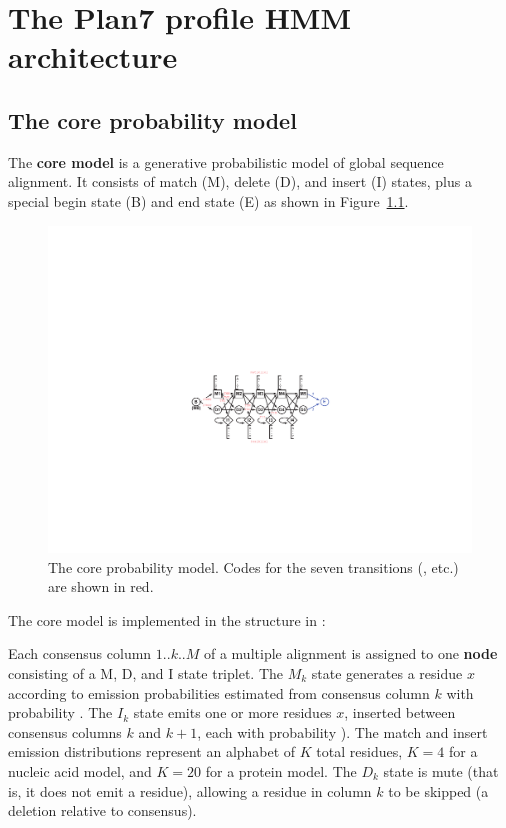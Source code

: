 
\chapter{The Plan7 profile HMM architecture}

%
\section{The core probability model}
%

The \textbf{core model} is a generative probabilistic model of global
sequence alignment. It consists of match (M), delete (D), and insert
(I) states, plus a special begin state (B) and end state (E) as shown
in Figure~\ref{fig:plan7-core}.

\begin{figure}
\begin{center}
\includegraphics{figures/plan7-core}
\end{center}
\caption{The core probability model. Codes for the seven
transitions (, etc.) are shown in red.} 
\label{fig:plan7-core}
\end{figure}

The core model is implemented in the  structure in
:



Each consensus column $1..k..M$ of a multiple alignment is assigned to
one \textbf{node} consisting of a M, D, and I state triplet. The $M_k$
state generates a residue $x$ according to emission probabilities
estimated from consensus column $k$ with probability
.  The $I_k$ state emits one or more residues $x$,
inserted between consensus columns $k$ and $k+1$, each with
probability ). The match and insert emission
distributions represent an alphabet of $K$ total residues, $K=4$ for a
nucleic acid model, and $K=20$ for a protein model. The $D_k$ state
is mute (that is, it does not emit a residue), allowing a residue in
column $k$ to be skipped (a deletion relative to consensus).

